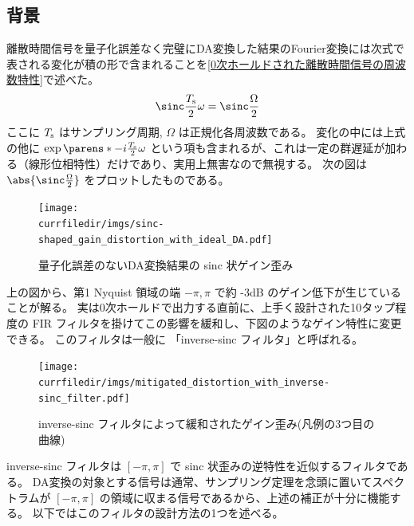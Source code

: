         \subsection{背景}
            離散時間信号を量子化誤差なく完璧にDA変換した結果のFourier変換には次式で表される変化が積の形で含まれることを\ref{0次ホールドされた離散時間信号の周波数特性}で述べた。
            \[ \sinc \frac{\Ts}{2}\omega = \sinc \frac{\Omega}{2} \]
            ここに $T_\text{s}$ はサンプリング周期, $\Omega$ は正規化各周波数である。
            変化の中には上式の他に $\exp\parens*{-i\frac{\Ts}{2}\omega}$ という項も含まれるが、これは一定の群遅延が加わる（線形位相特性）だけであり、実用上無害なので無視する。
            次の図は $\abs{\sinc \frac{\Omega}{2}}$ をプロットしたものである。
            \begin{figure}[H]
                \centering
                \texttt{[image: \\currfiledir/imgs/sinc-shaped\_gain\_distortion\_with\_ideal\_DA.pdf]}
                \caption{量子化誤差のないDA変換結果の sinc 状ゲイン歪み}
            \end{figure}
            上の図から、第1 Nyquist 領域の端 $-\pi, \pi$ で約 -3dB のゲイン低下が生じていることが解る。
            実は0次ホールドで出力する直前に、上手く設計された10タップ程度の FIR フィルタを掛けてこの影響を緩和し、下図のようなゲイン特性に変更できる。
            このフィルタは一般に 「inverse-sinc フィルタ」と呼ばれる。
            \begin{figure}[H]
                \centering
                \texttt{[image: \\currfiledir/imgs/mitigated\_distortion\_with\_inverse-sinc\_filter.pdf]}
                \caption{inverse-sinc フィルタによって緩和されたゲイン歪み(凡例の3つ目の曲線)}
                \label{inverse-sinc フィルタによって緩和されたゲイン歪み}
            \end{figure}
            inverse-sinc フィルタは $[-\pi, \pi]$ で sinc 状歪みの逆特性を近似するフィルタである。
            DA変換の対象とする信号は通常、サンプリング定理を念頭に置いてスペクトラムが $[-\pi,\pi]$ の領域に収まる信号であるから、上述の補正が十分に機能する。
            以下ではこのフィルタの設計方法の1つを述べる。
